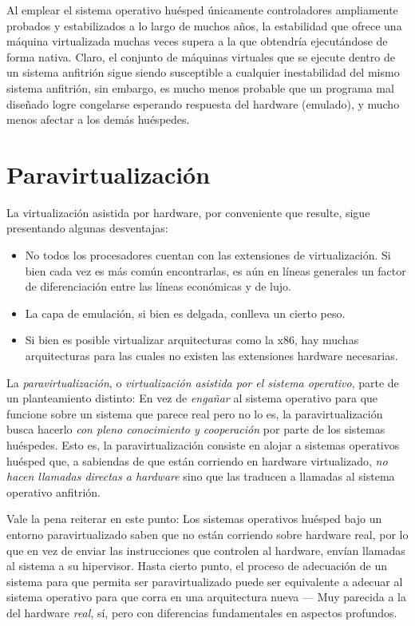 \documentclass[11pt,fleqn]{book} %
\begin{document}
Al emplear el sistema operativo huésped únicamente controladores
ampliamente probados y estabilizados a lo largo de muchos años, la
estabilidad que ofrece una máquina virtualizada muchas veces supera a
la que obtendría ejecutándose de forma nativa. Claro, el conjunto de
máquinas virtuales que se ejecute dentro de un sistema anfitrión
sigue siendo susceptible a cualquier inestabilidad del mismo sistema
anfitrión, sin embargo, es mucho menos probable que un programa mal
diseñado logre congelarse esperando respuesta del hardware (emulado),
y mucho menos afectar a los demás huéspedes.
\section{Paravirtualización}
\label{sec-9-4}
\label{VIRT_paravirt}


La virtualización asistida por hardware, por conveniente que resulte,
sigue presentando algunas desventajas:

\begin{itemize}
\item No todos los procesadores cuentan con las extensiones de
  virtualización. Si bien cada vez es más común encontrarlas, es aún
  en líneas generales un factor de diferenciación entre las líneas
  económicas y de lujo.
\item La capa de emulación, si bien es delgada, conlleva un cierto peso.
\item Si bien es posible virtualizar arquitecturas como la x86, hay
  muchas arquitecturas para las cuales no existen las extensiones
  hardware necesarias.
\end{itemize}

La \emph{paravirtualización}, o \emph{virtualización asistida por el sistema operativo}, parte de un planteamiento distinto: En vez de \emph{engañar} al
sistema operativo para que funcione sobre un sistema que parece real
pero no lo es, la paravirtualización busca hacerlo \emph{con pleno conocimiento y cooperación} por parte de los sistemas huéspedes.  Esto
es, la paravirtualización consiste en alojar a sistemas operativos
huésped que, a sabiendas de que están corriendo en hardware
virtualizado, \emph{no hacen llamadas directas a hardware} sino que las
traducen a llamadas al sistema operativo anfitrión.

Vale la pena reiterar en este punto: Los sistemas operativos huésped
bajo un entorno paravirtualizado saben que no están corriendo sobre
hardware real, por lo que en vez de enviar las instrucciones que
controlen al hardware, envían llamadas al sistema a su
hipervisor. Hasta cierto punto, el proceso de adecuación
de un sistema para que permita ser paravirtualizado puede ser equivalente
a adecuar al sistema operativo para que corra en una arquitectura
nueva — Muy parecida a la del hardware \emph{real}, sí, pero con
diferencias fundamentales en aspectos profundos.
\end{document}
